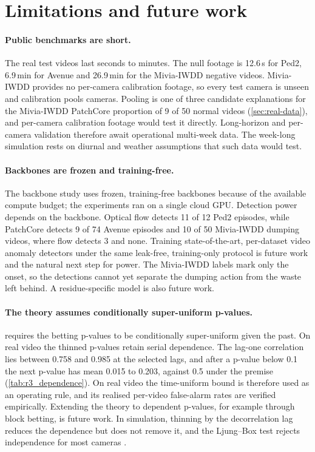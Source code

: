 \section{Limitations and future work}
\label{sec:limitations}

\paragraph{Public benchmarks are short.}
The real test videos last seconds to minutes. The null footage is 12.6\,s for Ped2, 6.9\,min for Avenue and 26.9\,min for the Mivia-IWDD negative videos. Mivia-IWDD provides no per-camera calibration footage, so every test camera is unseen and calibration pools cameras. Pooling is one of three candidate explanations for the Mivia-IWDD PatchCore proportion of 9 of 50 normal videos (\cref{sec:real-data}), and per-camera calibration footage would test it directly. Long-horizon and per-camera validation therefore await operational multi-week data. The week-long simulation rests on diurnal and weather assumptions that such data would test.

\paragraph{Backbones are frozen and training-free.}
The backbone study uses frozen, training-free backbones because of the available compute budget; the experiments ran on a single cloud GPU. Detection power depends on the backbone. Optical flow detects 11 of 12 Ped2 episodes, while PatchCore detects 9 of 74 Avenue episodes and 10 of 50 Mivia-IWDD dumping videos, where flow detects 3 and none. Training state-of-the-art, per-dataset video anomaly detectors under the same leak-free, training-only protocol is future work and the natural next step for power. The Mivia-IWDD labels mark only the onset, so the detections cannot yet separate the dumping action from the waste left behind. A residue-specific model is also future work.

\paragraph{The theory assumes conditionally super-uniform p-values.}
 requires the betting p-values to be conditionally super-uniform given the past. On real video the thinned p-values retain serial dependence. The lag-one correlation lies between 0.758 and 0.985 at the selected lags, and after a p-value below 0.1 the next p-value has mean 0.015 to 0.203, against 0.5 under the premise (\cref{tab:r3_dependence}). On real video the time-uniform bound is therefore used as an operating rule, and its realised per-video false-alarm rates are verified empirically. Extending the theory to dependent p-values, for example through block betting, is future work. In simulation, thinning by the decorrelation lag reduces the dependence but does not remove it, and the Ljung--Box test rejects independence for most cameras \citep{ljung1978}.

